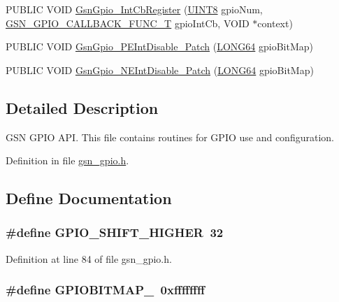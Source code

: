 \begin{DoxyCompactItemize}
PUBLIC VOID \hyperlink{a00503_ad646094622e6b22bf1857bea77346999}{GsnGpio\_\-IntCbRegister} (\hyperlink{a00660_gab27e9918b538ce9d8ca692479b375b6a}{UINT8} gpioNum, \hyperlink{a00648_gae6698a8151cd85d7dac2358199ed7c6e}{GSN\_\-GPIO\_\-CALLBACK\_\-FUNC\_\-T} gpioIntCb, VOID $\ast$context)
\item 
PUBLIC VOID \hyperlink{a00503_a8ba821cde77b7a9e58ca67bc1fe48723}{GsnGpio\_\-PEIntDisable\_\-Patch} (\hyperlink{a00660_gae57305825c7d329ad8a3065ae045e875}{LONG64} gpioBitMap)
\item 
PUBLIC VOID \hyperlink{a00503_a2dfaaeb872b51ede6a1693569ea83e35}{GsnGpio\_\-NEIntDisable\_\-Patch} (\hyperlink{a00660_gae57305825c7d329ad8a3065ae045e875}{LONG64} gpioBitMap)
\end{DoxyCompactItemize}


\subsection{Detailed Description}
GSN GPIO API. This file contains routines for GPIO use and configuration. 

Definition in file \hyperlink{a00503_source}{gsn\_\-gpio.h}.



\subsection{Define Documentation}
\hypertarget{a00503_adaab8557299a2f70ac7f00d23f028453}{
\subsubsection[{GPIO\_\-SHIFT\_\-HIGHER}]{\setlength{\rightskip}{0pt plus 5cm}\#define GPIO\_\-SHIFT\_\-HIGHER~32}}
\label{a00503_adaab8557299a2f70ac7f00d23f028453}


Definition at line 84 of file gsn\_\-gpio.h.

\hypertarget{a00503_a72bfa1f319c6cdd63346a31c1fb3b723}{
\subsubsection[{GPIOBITMAP\_\-32}]{\setlength{\rightskip}{0pt plus 5cm}\#define GPIOBITMAP\_~0xffffffff}}
\label{a00503_a72bfa1f319c6cdd63346a31c1fb3b723}


